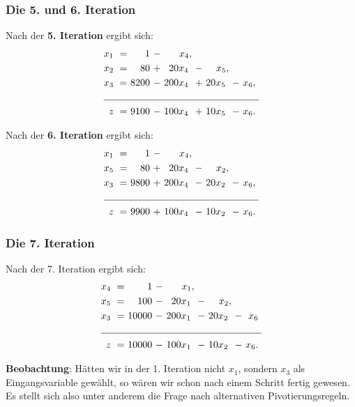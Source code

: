 \documentclass[smaller]{beamer}
\begin{document}
\begin{frame}
 \frametitle{Die 5. und 6. Iteration}
 Nach der \textbf{5. Iteration} ergibt sich:
\begin{align*}
\begin{alignedat}{5}
x_1 &\ = &\     1 &\ - &\    x_4, &\   &\       &\   &\      \\
x_2 &\ = &\    80 &\ + &\  20x_4\ &\ - &\   x_5, &\   &\      \\
x_3 &\ = &\  8200 &\ - &\ 200x_4\ &\ + &\ 20x_5\ &\ - &\ x_6,\ \\ \cline{1-9}
  z &\ = &\  9100 &\ - &\ 100x_4\ &\ + &\ 10x_5\ &\ - &\ x_6.\ 
\end{alignedat}
\end{align*}

Nach der \textbf{6. Iteration} ergibt sich:
\begin{align*}
\begin{alignedat}{5}
x_1 &\ = &\     1 &\ - &\    x_4, &\   &\       &\   &\      \\
x_5 &\ = &\    80 &\ + &\  20x_4\ &\ - &\   x_2, &\   &\      \\
x_3 &\ = &\  9800 &\ + &\ 200x_4\ &\ - &\ 20x_2\ &\ - &\ x_6,\ \\ \cline{1-9}
  z &\ = &\  9900 &\ + &\ 100x_4\ &\ - &\ 10x_2\ &\ - &\ x_6.\  
\end{alignedat}
\end{align*}
\end{frame}

\begin{frame}
 \frametitle{Die 7. Iteration}
 Nach der 7. Iteration ergibt sich:
\begin{align*}
\begin{alignedat}{5}
x_4 &\ = &\     1 &\ - &\    x_1, &\   &\       &\   &\      \\
x_5 &\ = &\   100 &\ - &\  20x_1\ &\ - &\   x_2, &\   &\      \\
x_3 &\ = &\ 10000 &\ - &\ 200x_1\ &\ - &\ 20x_2\ &\ - &\ x_6\ \\ \cline{1-9}
  z &\ = &\ 10000 &\ - &\ 100x_1\ &\ - &\ 10x_2\ &\ - &\ x_6.\  
\end{alignedat}
\end{align*}

\textbf{Beobachtung}: Hätten wir in der 1. Iteration nicht $x_1$, sondern $x_3$ als Eingangsvariable gewählt, so wären wir schon nach einem Schritt fertig gewesen. \alert{Es stellt sich also unter anderem die Frage nach alternativen Pivotierungsregeln}.
\end{frame}
\end{document}
